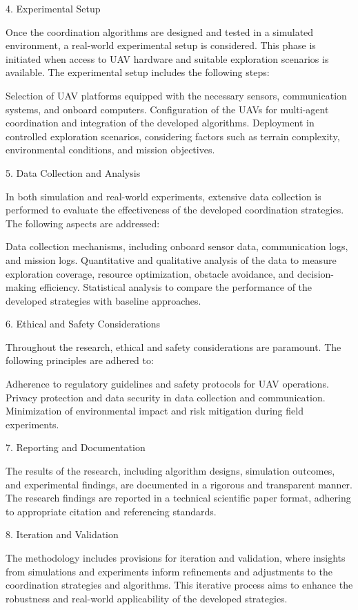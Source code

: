 \documentclass[sigconf]{acmart}
\begin{document}
4. Experimental Setup

Once the coordination algorithms are designed and tested in a simulated environment, a real-world experimental setup is considered. This phase is initiated when access to UAV hardware and suitable exploration scenarios is available. The experimental setup includes the following steps:

    Selection of UAV platforms equipped with the necessary sensors, communication systems, and onboard computers.
    Configuration of the UAVs for multi-agent coordination and integration of the developed algorithms.
    Deployment in controlled exploration scenarios, considering factors such as terrain complexity, environmental conditions, and mission objectives.

5. Data Collection and Analysis

In both simulation and real-world experiments, extensive data collection is performed to evaluate the effectiveness of the developed coordination strategies. The following aspects are addressed:

    Data collection mechanisms, including onboard sensor data, communication logs, and mission logs.
    Quantitative and qualitative analysis of the data to measure exploration coverage, resource optimization, obstacle avoidance, and decision-making efficiency.
    Statistical analysis to compare the performance of the developed strategies with baseline approaches.

6. Ethical and Safety Considerations

Throughout the research, ethical and safety considerations are paramount. The following principles are adhered to:

    Adherence to regulatory guidelines and safety protocols for UAV operations.
    Privacy protection and data security in data collection and communication.
    Minimization of environmental impact and risk mitigation during field experiments.

7. Reporting and Documentation

The results of the research, including algorithm designs, simulation outcomes, and experimental findings, are documented in a rigorous and transparent manner. The research findings are reported in a technical scientific paper format, adhering to appropriate citation and referencing standards.

8. Iteration and Validation

The methodology includes provisions for iteration and validation, where insights from simulations and experiments inform refinements and adjustments to the coordination strategies and algorithms. This iterative process aims to enhance the robustness and real-world applicability of the developed strategies.
\end{document}
